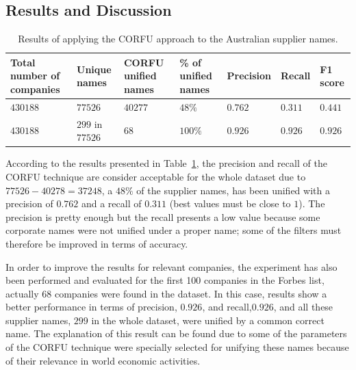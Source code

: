 \documentclass{llncs}
\begin{document}

\subsection{Results and Discussion}

\begin{table}[!h]
\renewcommand{\arraystretch}{1.3}
\begin{center}
\begin{tabular}{|p{2.5cm}|p{2cm}|p{1.5cm}|p{1.8cm}|l|l|l|}
\hline
  \textbf{Total number of companies} & \textbf{Unique names}& \textbf{CORFU unified names}& \textbf{\% of unified names} & \textbf{Precision} & \textbf{Recall} & \textbf{F1 score} \\  \hline
   $430188$ & $77526$ & $40277$  &$48\%$ & $0.762$ & $0.311$&$0.441$ \\ \hline   
   $430188$ & $299$ in $77526$ & $68$ & $100\%$&  $0.926$ & $0.926$ &$0.926$\\ \hline
  \hline
  \end{tabular}
  \caption{Results of applying the CORFU approach to the Australian supplier names.}
  \label{tabla:aus-results}
  \end{center}
\end{table} 


According to the results presented in Table~\ref{tabla:aus-results}, the precision 
and recall of the CORFU technique are consider acceptable for the whole dataset 
due to $77526-40278=37248$, a $48\%$ of the supplier names, has been unified with 
a precision of $0.762$ and a recall of $0.311$ (best values must be close to $1$). 
The precision is pretty enough but the recall presents a low value because some 
corporate names were not unified under a proper name; some of the filters must therefore 
be improved in terms of accuracy.

In order to improve the results for relevant companies, the experiment has also 
been performed and evaluated for the first 100 companies in the Forbes list, actually $68$ companies were 
found in the dataset. In this case, results show a better performance in terms of precision, $0.926$, and recall,$0.926$, and 
all these supplier names, $299$ in the whole dataset, were unified by a common correct name. 
The explanation of this result can be found due to some of the parameters of the CORFU technique were specially selected for unifying 
these names because of their relevance in world economic activities.
\end{document}

